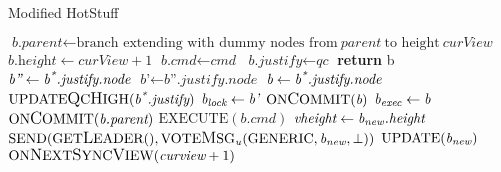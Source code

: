 \begin{algorithm}[h!]
	\caption{Modified HotStuff}\label{hotstuff}
	\begin{algorithmic}[1]
	 \label{code_createleaf}
		\color{Magenta}
		\State $\textit{b.parent} \gets \text{branch extending with dummy nodes from}\ \textit{parent}\ \text{to height}\ \textit{curView}$
		\State $\textit{b.height} \gets \textit{curView} + 1$
		\color{black}
		\State $\textit{b.cmd} \gets \textit{cmd}$
		\State $\textit{b.justify} \gets \textit{qc}$
		\State \textbf{return} b
	\EndFunction
		\State $\textit{b''} \gets \textit{b\textsuperscript{*}.justify.node}$
		\State $\textit{b'} \gets \textit{b''.justify.node}$
		\State $\textit{b} \gets \textit{b\textsuperscript{*}.justify.node}$
		\State $\text{UPDATE{\large Q}C{\large H}IGH}(\textit{b\textsuperscript{*}.justify})$
			\State $\textit{b\textsubscript{lock}} \gets \textit{b'}$
		\EndIf
			\State $\text{ON{\large C}OMMIT}(\textit{b})$
			\State $\textit{b\textsubscript{exec}} \gets \textit{b}$
		\EndIf
	\EndProcedure
			\State $\text{ON{\large C}OMMIT}(\textit{b.parent})$
			\State $\text{EXECUTE}(\textit{b.cmd})$
		\EndIf
	\EndProcedure
	 \label{code_onreceiveproposal}
		\color{Green}
		 \label{code_checkview}
			\color{black}
				\State $\textit{vheight} \gets \textit{b\textsubscript{new}.height}$
				\State $ \text{SEND}(\text{GET{\large L}EADER}(), \text{VOTE{\large M}SG}\textsubscript{\textit{u}}(\text{GENERIC}, \textit{b\textsubscript{new}}, \bot))$
			\EndIf
			\State $\text{UPDATE}(\textit{b\textsubscript{new}})$
			\color{Green}
			 \label{code_proposaltransition}
				\State $\text{ON{\large N}EXT{\large S}YNC{\large V}IEW}(\textit{curview} + 1)$
			\EndIf

\end{algorithmic}
\end{algorithm}
